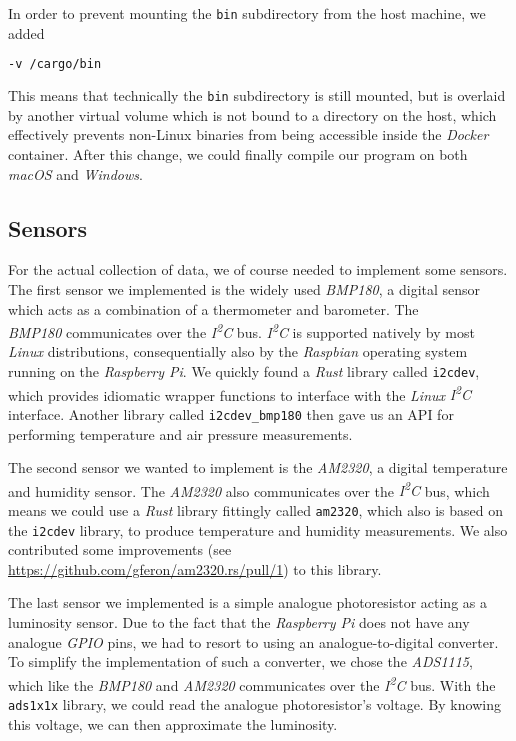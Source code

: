 In order to prevent mounting the \texttt{bin} subdirectory from the host machine, we added

\begin{lstlisting}[language=Bash]
-v /cargo/bin
\end{lstlisting}

This means that technically the \texttt{bin} subdirectory is still mounted, but is overlaid by
another virtual volume which is not bound to a directory on the host, which effectively prevents
non-Linux binaries from being accessible inside the \textit{Docker} container. After this change, we could
finally compile our program on both \textit{macOS} and \textit{Windows}.

\subsection{Sensors}

For the actual collection of data, we of course needed to implement some sensors. The first sensor
we implemented is the widely used \textit{BMP180}, a digital sensor which acts as a combination of a
thermometer and barometer. The \\ \textit{BMP180} communicates over the \textit{I\textsuperscript{2}C}
bus. \textit{I\textsuperscript{2}C} is supported natively by most \textit{Linux} distributions,
consequentially also by the \textit{Raspbian} operating system running on the \textit{Raspberry Pi}.
We quickly found a \textit{Rust} library called \texttt{i2cdev}, which provides idiomatic wrapper functions
to interface with the \textit{Linux} \textit{I\textsuperscript{2}C} interface. Another library
called \texttt{i2cdev\_bmp180} then gave us an API for performing temperature and air pressure
measurements.

The second sensor we wanted to implement is the \textit{AM2320}, a digital temperature and humidity
sensor. The \textit{AM2320} also communicates over the \textit{I\textsuperscript{2}C} bus, which
means we could use a \textit{Rust} library fittingly called \texttt{am2320}, which also is based on the
\texttt{i2cdev} library, to produce temperature and humidity measurements. We also contributed some
improvements (see \url{https://github.com/gferon/am2320.rs/pull/1}) to this library.

The last sensor we implemented is a simple analogue photoresistor acting as a luminosity sensor. Due
to the fact that the \textit{Raspberry Pi} does not have any analogue \textit{GPIO} pins, we had to
resort to using an analogue-to-digital converter. To simplify the implementation of such a
converter, we chose the \textit{ADS1115}, which like the \textit{BMP180} and \textit{AM2320}
communicates over the \textit{I\textsuperscript{2}C} bus. With the \texttt{ads1x1x} library, we
could read the analogue photoresistor's voltage. By knowing this voltage, we can then
approximate the luminosity.

